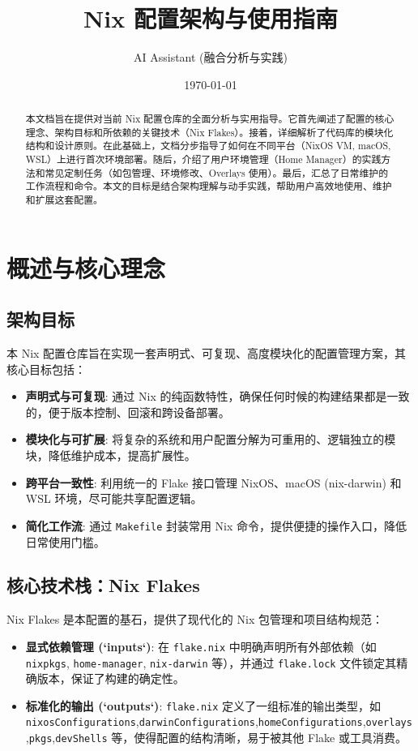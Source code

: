 \documentclass[11pt, a4paper]{article} %
\title{Nix 配置架构与使用指南}
\author{AI Assistant (融合分析与实践)}
\date{\today}
\begin{document}
\maketitle

\begin{abstract}
本文档旨在提供对当前 Nix 配置仓库的全面分析与实用指导。它首先阐述了配置的核心理念、架构目标和所依赖的关键技术（Nix Flakes）。接着，详细解析了代码库的模块化结构和设计原则。在此基础上，文档分步指导了如何在不同平台（NixOS VM, macOS, WSL）上进行首次环境部署。随后，介绍了用户环境管理（Home Manager）的实践方法和常见定制任务（如包管理、环境修改、Overlays 使用）。最后，汇总了日常维护的工作流程和命令。本文的目标是结合架构理解与动手实践，帮助用户高效地使用、维护和扩展这套配置。
\end{abstract}

\tableofcontents
\newpage


\section{概述与核心理念}

\subsection{架构目标}
本 Nix 配置仓库旨在实现一套声明式、可复现、高度模块化的配置管理方案，其核心目标包括：
    \begin{itemize}
        \item \textbf{声明式与可复现}: 通过 Nix 的纯函数特性，确保任何时候的构建结果都是一致的，便于版本控制、回滚和跨设备部署。
        \item \textbf{模块化与可扩展}: 将复杂的系统和用户配置分解为可重用的、逻辑独立的模块，降低维护成本，提高扩展性。
        \item \textbf{跨平台一致性}: 利用统一的 Flake 接口管理 NixOS、macOS (nix-darwin) 和 WSL 环境，尽可能共享配置逻辑。
        \item \textbf{简化工作流}: 通过 \texttt{Makefile} 封装常用 Nix 命令，提供便捷的操作入口，降低日常使用门槛。
    \end{itemize}

\subsection{核心技术栈：Nix Flakes}
Nix Flakes 是本配置的基石，提供了现代化的 Nix 包管理和项目结构规范：
    \begin{itemize}
        \item \textbf{显式依赖管理 (`inputs`)}: 在 \texttt{flake.nix} 中明确声明所有外部依赖（如 \texttt{nixpkgs}, \texttt{home-manager}, \texttt{nix-darwin} 等），并通过 \texttt{flake.lock} 文件锁定其精确版本，保证了构建的确定性。
        \item \textbf{标准化的输出 (`outputs`)}: \texttt{flake.nix} 定义了一组标准的输出类型，如 \texttt{nixosConfigurations},\allowbreak \texttt{darwinConfigurations},\allowbreak \texttt{homeConfigurations},\allowbreak \texttt{overlays},\allowbreak \texttt{pkgs},\allowbreak \texttt{devShells} 等，使得配置的结构清晰，易于被其他 Flake 或工具消费。
    \end{itemize}
\end{document}
